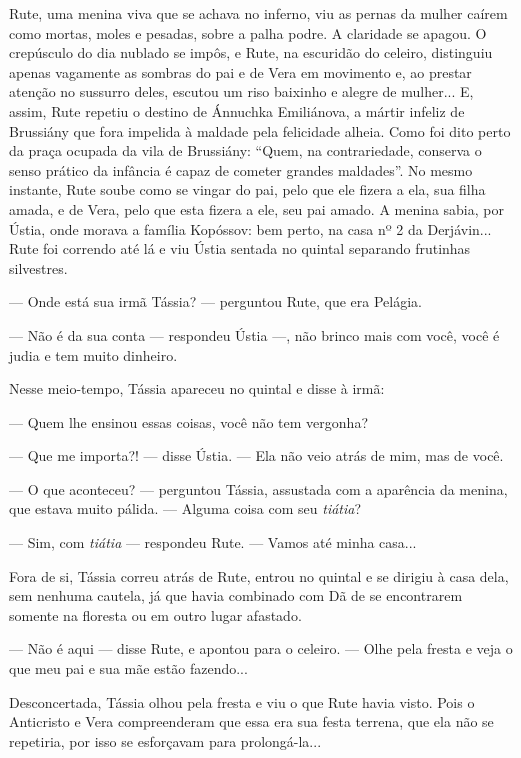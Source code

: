 Rute, uma menina viva que se achava no inferno, viu as pernas da mulher
caírem como mortas, moles e pesadas, sobre a palha podre. A claridade se
apagou. O crepúsculo do dia nublado se impôs, e Rute, na escuridão do
celeiro, distinguiu apenas vagamente as sombras do pai e de Vera em
movimento e, ao prestar atenção no sussurro deles, escutou um riso
baixinho e alegre de mulher... E, assim, Rute repetiu o destino de
Ánnuchka Emiliánova, a mártir infeliz de Brussiány que fora impelida à
maldade pela felicidade alheia. Como foi dito perto da praça ocupada da
vila de Brussiány: ``Quem, na contrariedade, conserva o senso prático da
infância é capaz de cometer grandes maldades''. No mesmo instante, Rute
soube como se vingar do pai, pelo que ele fizera a ela, sua filha amada,
e de Vera, pelo que esta fizera a ele, seu pai amado. A menina sabia,
por Ústia, onde morava a família Kopóssov: bem perto, na casa nº 2 da
Derjávin... Rute foi correndo até lá e viu Ústia sentada no quintal
separando frutinhas silvestres.

--- Onde está sua irmã Tássia? --- perguntou Rute, que era Pelágia.

--- Não é da sua conta --- respondeu Ústia ---, não brinco mais com
você, você é judia e tem muito dinheiro.

Nesse meio-tempo, Tássia apareceu no quintal e disse à irmã:

--- Quem lhe ensinou essas coisas, você não tem vergonha?

--- Que me importa?! --- disse Ústia. --- Ela não veio atrás de mim, mas
de você.

--- O que aconteceu? --- perguntou Tássia, assustada com a aparência da
menina, que estava muito pálida. --- Alguma coisa com seu \emph{tiátia}?

--- Sim, com \emph{tiátia} --- respondeu Rute. --- Vamos até minha
casa...

Fora de si, Tássia correu atrás de Rute, entrou no quintal e se dirigiu
à casa dela, sem nenhuma cautela, já que havia combinado com Dã de se
encontrarem somente na floresta ou em outro lugar afastado.

--- Não é aqui --- disse Rute, e apontou para o celeiro. --- Olhe pela
fresta e veja o que meu pai e sua mãe estão fazendo...

Desconcertada, Tássia olhou pela fresta e viu o que Rute havia visto.
Pois o Anticristo e Vera compreenderam que essa era sua festa terrena,
que ela não se repetiria, por isso se esforçavam para prolongá-la...


